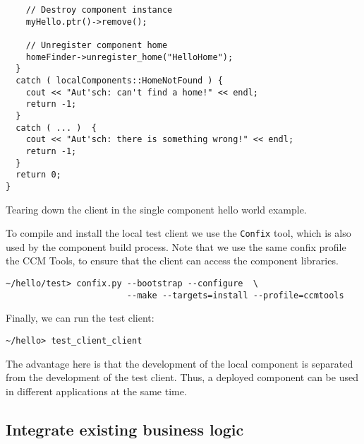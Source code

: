 \begin{Example}
\begin{minifbox}
\begin{small}
\begin{verbatim}
    // Destroy component instance
    myHello.ptr()->remove();

    // Unregister component home
    homeFinder->unregister_home("HelloHome");
  }
  catch ( localComponents::HomeNotFound ) {
    cout << "Aut'sch: can't find a home!" << endl;
    return -1;
  }
  catch ( ... )  {
    cout << "Aut'sch: there is something wrong!" << endl;
    return -1;
  }
  return 0;
}
\end{verbatim}
\end{small}
\end{minifbox}
\caption{Tearing down the client in the single component hello world example.}
\label{example:one-component-test-teardown}
\end{Example}

To compile and install the local test client we use the {\tt Confix} tool, which
is also used by the component build process. Note that we use the same confix
profile the CCM Tools, to ensure that the client can access the component
libraries.
\begin{small}
\begin{verbatim}
~/hello/test> confix.py --bootstrap --configure  \
                        --make --targets=install --profile=ccmtools
\end{verbatim}
\end{small}

Finally, we can run the test client:
\begin{small}
\begin{verbatim}
~/hello> test_client_client
\end{verbatim}
\end{small}

The advantage here is that the development of the local component is separated
from the development of the test client. Thus, a deployed component can be used
in different applications at the same time.

\subsection{Integrate existing business logic}

